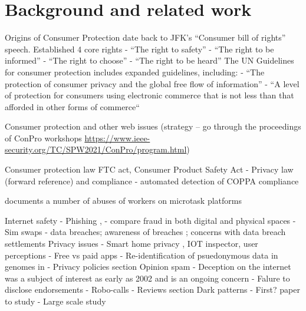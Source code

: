 \chapter{Background and related work} \label{ch:background}

Origins of Consumer Protection date back to JFK's ``Consumer bill of rights'' speech. Established 4 core rights \cite{kennedy1962special}
- ``The right to safety''
- ``The right to be informed''
- ``The right to choose''
- ``The right to be heard''
The UN Guidelines for consumer protection includes expanded guidelines, including: \cite{un2003conpro}
- ``The  protection  of  consumer  privacy  and  the  global  free  flow  of  
information''
- ``A  level  of  protection  for  consumers  using  electronic  commerce  that is not less than that afforded in other forms of commerce``


Consumer protection and other web issues
(strategy -- go through the proceedings of ConPro workshops \url{https://www.ieee-security.org/TC/SPW2021/ConPro/program.html})

Consumer protection law
FTC act, Consumer Product Safety Act
- Privacy law (forward reference) and compliance
    - \cite{reyes2018won} automated detection of COPPA compliance

\cite{yeung2021Bad} documents a number of abuses of workers on microtask platforms



Internet safety
- Phishing \cite{hong2012state}, 
- \cite{khan2017old} compare fraud in both digital and physical spaces
- Sim swaps \cite{lee2020empirical}
- data breaches; awareness of breaches \cite{bhagavatula2021breach}; concerns with data breach settlements \cite{amos2019enhancing}
Privacy issues
- Smart home privacy \cite{apthorpe2019evaluating},  IOT inspector\cite{huang2020iot}, user perceptions \cite{zheng2018user}
- Free vs paid apps \cite{bamberger2020can}
- Re-identification of psuedonymous data in genomes \cite{malin2004not} in 
- Privacy policies section 
Opinion spam
- Deception on the internet was a subject of interest as early as 2002 \cite{forbes2002web} and is an ongoing concern \cite{zeng2020bad} \cite{hounsel2020identifying}
- Falure to disclose endorsements \cite{mathur2018endorsements}
- Robo-calls \cite{azad2020socioscope}
- Reviews section
Dark patterns
- First? paper to study \cite{gray2018dark}
- Large scale study \cite{mathur2019dark}